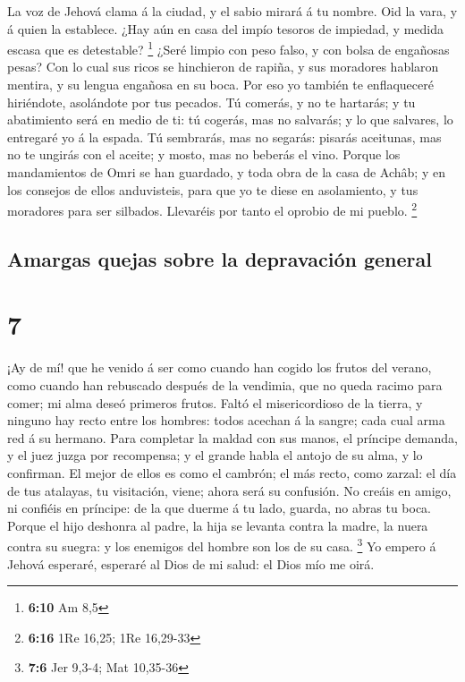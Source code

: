  La voz de Jehová clama á la ciudad, y el sabio mirará á tu
nombre. Oid la vara, y á quien la establece.  ¿Hay aún en
casa del impío tesoros de impiedad, y medida escasa que es detestable?
\footnote{\textbf{6:10} Am 8,5}  ¿Seré limpio con peso
falso, y con bolsa de engañosas pesas?  Con lo cual sus
ricos se hinchieron de rapiña, y sus moradores hablaron mentira, y su
lengua engañosa en su boca.  Por eso yo también te
enflaqueceré hiriéndote, asolándote por tus pecados.  Tú
comerás, y no te hartarás; y tu abatimiento será en medio de ti: tú
cogerás, mas no salvarás; y lo que salvares, lo entregaré yo á la
espada.  Tú sembrarás, mas no segarás: pisarás aceitunas,
mas no te ungirás con el aceite; y mosto, mas no beberás el vino.
 Porque los mandamientos de Omri se han guardado, y toda
obra de la casa de Achâb; y en los consejos de ellos anduvisteis, para
que yo te diese en asolamiento, y tus moradores para ser silbados.
Llevaréis por tanto el oprobio de mi pueblo. \footnote{\textbf{6:16} 1Re
  16,25; 1Re 16,29-33}

\hypertarget{amargas-quejas-sobre-la-depravaciuxf3n-general}{%
\subsection{Amargas quejas sobre la depravación
general}\label{amargas-quejas-sobre-la-depravaciuxf3n-general}}

\hypertarget{section-6}{%
\section{7}\label{section-6}}

 ¡Ay de mí! que he venido á ser como cuando han cogido los
frutos del verano, como cuando han rebuscado después de la vendimia, que
no queda racimo para comer; mi alma deseó primeros frutos. 
Faltó el misericordioso de la tierra, y ninguno hay recto entre los
hombres: todos acechan á la sangre; cada cual arma red á su hermano.
 Para completar la maldad con sus manos, el príncipe
demanda, y el juez juzga por recompensa; y el grande habla el antojo de
su alma, y lo confirman.  El mejor de ellos es como el
cambrón; el más recto, como zarzal: el día de tus atalayas, tu
visitación, viene; ahora será su confusión.  No creáis en
amigo, ni confiéis en príncipe: de la que duerme á tu lado, guarda, no
abras tu boca.  Porque el hijo deshonra al padre, la hija se
levanta contra la madre, la nuera contra su suegra: y los enemigos del
hombre son los de su casa. \footnote{\textbf{7:6} Jer 9,3-4; Mat
  10,35-36}  Yo empero á Jehová esperaré, esperaré al Dios
de mi salud: el Dios mío me oirá.

